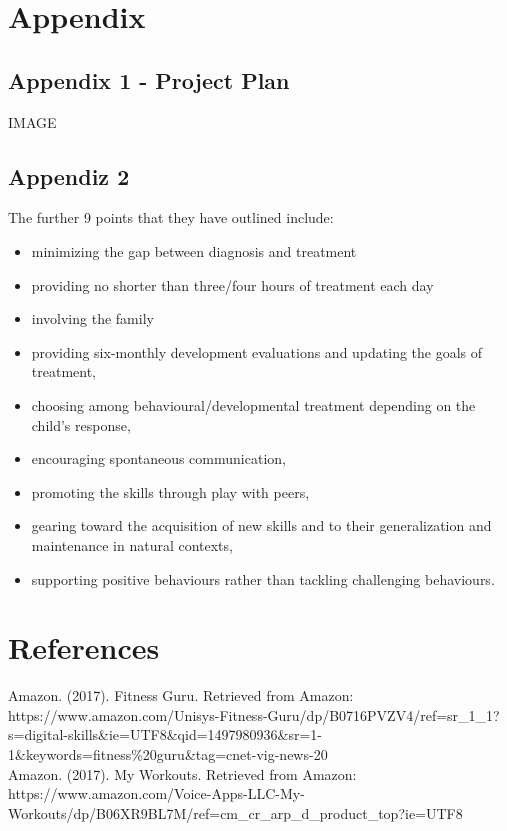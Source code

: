 \documentclass[a4paper,11pt]{report}
\begin{document}
\chapter{Appendix}
\section{Appendix 1 - Project Plan}
IMAGE\\

\section{Appendiz 2}
The further 9 points that they have outlined include:\\
\begin{itemize}
\item minimizing the gap between diagnosis and treatment
\item providing no shorter than three/four hours of treatment each day
\item involving the family
\item providing six-monthly development evaluations and updating the goals of treatment, 
\item choosing among behavioural/developmental treatment depending on the child’s response,
\item	encouraging spontaneous communication,
\item	promoting the skills through play with peers,
\item	gearing toward the acquisition of new skills and to their generalization and maintenance in natural contexts,
\item	supporting positive behaviours rather than tackling challenging behaviours. 
\end{itemize}

\chapter{References}
Amazon. (2017). Fitness Guru. Retrieved from Amazon: https://www.amazon.com/Unisys-Fitness-Guru/dp/B0716PVZV4/ref=sr\_1\_1?s=digital-skills\&ie=UTF8\&qid=1497980936\&sr=1-1\&keywords=fitness\%20guru\&tag=cnet-vig-news-20\\

Amazon. (2017). My Workouts. Retrieved from Amazon: https://www.amazon.com/Voice-Apps-LLC-My-Workouts/dp/B06XR9BL7M/ref=cm\_cr\_arp\_d\_product\_top?ie=UTF8\\
\end{document}
